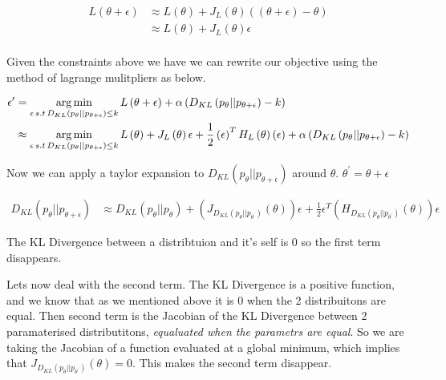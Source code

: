 \documentclass[12pt, a4paper]{report}
\theoremstyle{definition}
\begin{document}
\begin{align*}
L\left(\theta + \epsilon\right) &\approx L\left( \theta \right) + J_L \left( \theta\right) \left( \left( \theta + \epsilon \right) - \theta \right)  \\
&\approx L\left( \theta \right) +  J_L \left( \theta\right) \epsilon \\
\end{align*}

Given the constraints above we have we can rewrite our objective using the method of lagrange mulitpliers as below.

\begin{align}
    \epsilon^\prime &= \operatorname*{arg\,min}_{\epsilon \, s.t \, D_{KL} \left(p_\theta || p_{\theta + \epsilon} \right) \leq k} L \left( \theta + \epsilon \right) + \alpha \left( D_{KL} \left(p_\theta || p_{\theta + \epsilon} \right) - k\right) \\
    &\approx \operatorname*{arg\,min}_{\epsilon \, s.t \, D_{KL} \left(p_\theta || p_{\theta + \epsilon} \right) \leq k}  L\left( \theta \right) +  J_L \left( \theta\right) \epsilon  + \frac{1}{2} \left(\epsilon \right)^T H_L \left(\theta \right) \left( \epsilon\right) + \alpha \left( D_{KL} \left(p_\theta || p_{\theta + \epsilon} \right) - k\right) \\
\end{align}

Now we can apply a taylor expansion to $D_{KL} \left(p_\theta || p_{\theta + \epsilon} \right)$ around $\theta$. $\theta^\prime = \theta + \epsilon$


\begin{align}
    D_{KL} \left(p_\theta || p_{\theta + \epsilon} \right) &\approx  D_{KL} \left(p_\theta || p_{\theta} \right) + \left(J_{D_{KL} \left(p_\theta || p_{\theta^\prime} \right)}\left( \theta \right) \right) \epsilon + \frac{1}{2} \epsilon^T \left( H_{D_{KL} \left(p_\theta || p_{\theta^\prime} \right)}\left( \theta \right) \right) \epsilon
\end{align}

The KL Divergence between a distribtuion and it's self is $0$ so the first term disappears.


Lets now deal with the second term. The KL Divergence is a positive function, and we know that as we mentioned above it is $0$ when the 2 distribuitons are equal. Then second term is the Jacobian of the KL Divergence between 2 paramaterised distributitons, \textit{equaluated when the parametrs are equal}. So we are taking the Jacobian of a function evaluated at a global minimum, which implies that $J_{D_{KL} \left(p_\theta || p_{\theta^\prime} \right)}\left( \theta \right)  = 0$. This makes the second term disappear.
\end{document}

